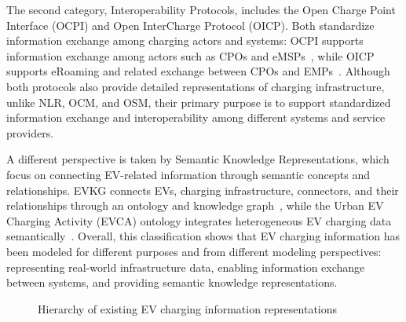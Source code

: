 \documentclass[sigconf]{acmart}
\begin{document}
The second category, Interoperability Protocols, includes the Open Charge Point Interface (OCPI) and Open InterCharge Protocol (OICP). Both standardize information exchange among charging actors and systems: OCPI supports information exchange among actors such as CPOs and eMSPs~\cite{ocpi}, while OICP supports eRoaming and related exchange between CPOs and EMPs~\cite{oicp}. Although both protocols also provide detailed representations of charging infrastructure, unlike NLR, OCM, and OSM, their primary purpose is to support standardized information exchange and interoperability among different systems and service providers.

A different perspective is taken by Semantic Knowledge Representations, which focus on connecting EV-related information through semantic concepts and relationships. EVKG connects EVs, charging infrastructure, connectors, and their relationships through an ontology and knowledge graph~\cite{evkg}, while the Urban EV Charging Activity (EVCA) ontology integrates heterogeneous EV charging data semantically~\cite{evca}. Overall, this classification shows that EV charging information has been modeled for different purposes and from different modeling perspectives: representing real-world infrastructure data, enabling information exchange between systems, and providing semantic knowledge representations.

\begin{figure}[t!]
\centering
{}
\caption{Hierarchy of existing EV charging information representations}
\label{fig:hierarchy}
\end{figure}
\end{document}
